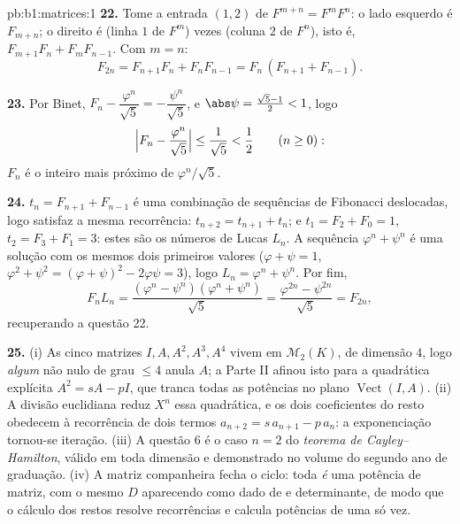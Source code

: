 \begin{solution}{pb:b1:matrices:1}
\textbf{22.} Tome a entrada $(1,2)$ de $F^{m+n} = F^m F^n$: o lado esquerdo é
$F_{m+n}$; o direito é (linha $1$ de $F^m$) vezes (coluna $2$ de
$F^n$), isto é, $F_{m+1}F_n + F_m F_{n-1}$. Com $m = n$:
\[
F_{2n} = F_{n+1}F_n + F_nF_{n-1} = F_n\,(F_{n+1} + F_{n-1}).
\]

\textbf{23.} Por Binet, $F_n - \dfrac{\varphi^n}{\sqrt5} =
-\dfrac{\psi^n}{\sqrt5}$, e $\abs\psi = \frac{\sqrt5 - 1}2 <
1$, logo
\[
\Bigl|F_n - \frac{\varphi^n}{\sqrt5}\Bigr|
\leq \frac{1}{\sqrt5} < \frac12
\qquad (n \geq 0):
\]
$F_n$ é o inteiro mais próximo de $\varphi^n/\sqrt5$.

\textbf{24.} $t_n = F_{n+1} + F_{n-1}$ é uma combinação de sequências de Fibonacci
deslocadas, logo satisfaz a mesma recorrência: $t_{n+2} = t_{n+1} + t_n$; e $t_1 = F_2 + F_0 =
1$,
$t_2 = F_3 + F_1 = 3$: estes são os números de Lucas $L_n$. A sequência $\varphi^n + \psi^n$ é uma
solução com os mesmos dois primeiros valores ($\varphi + \psi = 1$, $\varphi^2 + \psi^2 = (
\varphi + \psi)^2 - 2\varphi\psi = 3$), logo
$L_n = \varphi^n +
\psi^n$. Por fim,
\[
F_n L_n = \frac{(\varphi^n - \psi^n)(\varphi^n +
\psi^n)}{\sqrt5} = \frac{\varphi^{2n} - \psi^{2n}}{\sqrt5} =
F_{2n},
\]
recuperando a questão 22.

\textbf{25.} (i) As cinco matrizes $I, A, A^2, A^3, A^4$ vivem em $\mathcal{M}_2(K)$, de
dimensão $4$, logo \emph{algum}  não nulo de grau $\leq 4$
anula $A$; a Parte II afinou isto para a quadrática explícita
$A^2 = sA - pI$, que tranca todas as potências no plano $\operatorname{Vect}(I, A)$. (ii) A divisão
euclidiana reduz $X^n$  essa quadrática, e os dois
coeficientes do resto obedecem à recorrência de dois termos $a_{n+2} = s\,a_{n+1} - p\,a_n$:
a exponenciação tornou-se iteração. (iii) A questão 6 é o caso
$n = 2$ do \emph{teorema de Cayley--Hamilton}, válido em toda
dimensão e demonstrado no volume do segundo ano de graduação.
(iv) A matriz companheira fecha o ciclo: toda 
\emph{é} uma potência de matriz, com o mesmo  $D$
aparecendo como dado de  e determinante, de modo que o cálculo
dos restos resolve recorrências e calcula potências de uma só vez.
\end{solution}

